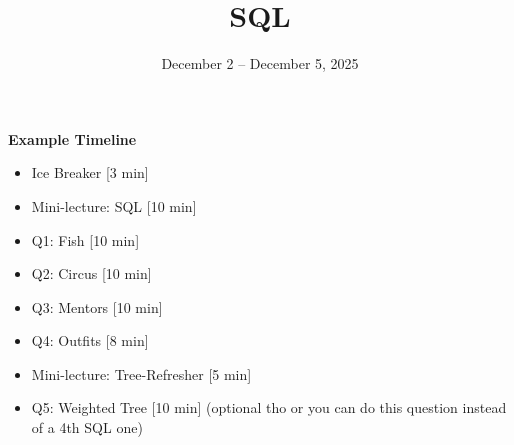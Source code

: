 \documentclass{exam}
\title{SQL}
\date{December 2 -- December 5, 2025}
\begin{document}
\maketitle

\begin{meta}
    \textbf{Example Timeline}
    \begin{itemize}
        \item Ice Breaker [3 min]
        \item Mini-lecture: SQL [10 min]
        \item Q1: Fish [10 min]
        \item Q2: Circus [10 min]
        \item Q3: Mentors [10 min]
        \item Q4: Outfits [8 min]
        \item Mini-lecture: Tree-Refresher [5 min]
        \item Q5: Weighted Tree [10 min] (optional tho or you can do this question instead of a 4th SQL one)
        
    \end{itemize}

\end{meta}
\end{document}
